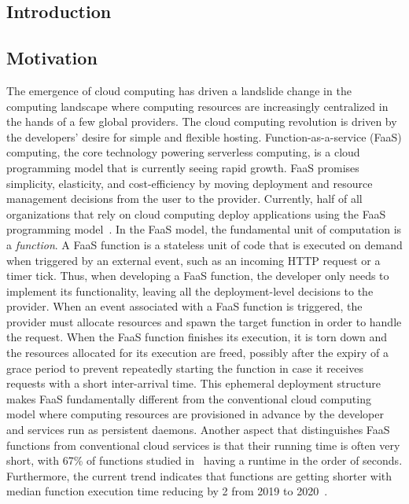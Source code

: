 \documentclass[../main.tex]{subfiles}
\begin{document}
\ifx\chapincluded\undefined
  \begin{refsection}
 \fi

\chapter{Introduction}
\label{chap:intro}

\section{Motivation}

The emergence of cloud computing has driven a landslide change in the
computing landscape where computing resources are increasingly
centralized in the hands of a few global providers. The cloud
computing revolution is driven by the developers' desire for simple and
flexible hosting. Function-as-a-service (FaaS) computing, the core
technology powering serverless computing, is a cloud programming model
that is currently seeing rapid growth. FaaS promises simplicity,
elasticity, and cost-efficiency by moving deployment and resource
management decisions from the user to the provider. Currently, half of all organizations that rely on cloud computing deploy applications using the FaaS programming model~\cite{serverless_state}. In the FaaS model, the fundamental
unit of computation is a \emph{function}. A FaaS function is a
stateless unit of code that is executed on demand when triggered by an
external event, such as an incoming HTTP request or a timer
tick. Thus, when developing a FaaS function, the developer only needs
to implement its functionality, leaving all the deployment-level
decisions to the provider.
When an event associated with a FaaS function is triggered, the
provider must allocate resources and spawn the target function in
order to handle the request. When the FaaS function finishes its
execution, it is torn down and the resources allocated for its
execution are freed, possibly after the expiry of a grace period to
prevent repeatedly starting the function in case it receives requests
with a short inter-arrival time. This ephemeral deployment structure
makes FaaS fundamentally different from the conventional cloud
computing model where computing resources are provisioned in advance
by the developer and services run as persistent daemons. Another
aspect that distinguishes FaaS functions from conventional cloud
services is that their running time is often very short, with 67\% of
functions studied
in~\cite{eismann20_review_server_use_cases_their_charac} having a
runtime in the order of seconds. Furthermore, the current trend
indicates that functions are getting shorter with median function
execution time reducing by 2\texttimes{} from 2019 to
2020~\cite{serverless_state_21}.



\end{refsection}
\end{document}
